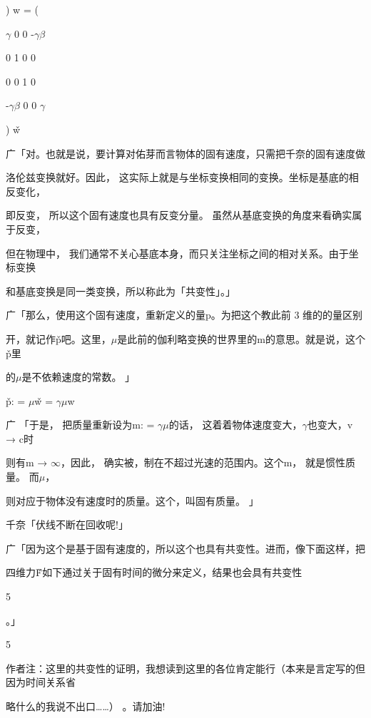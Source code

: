 ) w = (\par
$\gamma$ 0 0 -$\gamma$$\beta$\par
0 1 0 0\par
0 0 1 0\par
-$\gamma$$\beta$ 0 0 $\gamma$\par
) w̌\par
广「对。也就是说，要计算对佑芽而言物体的固有速度，只需把千奈的固有速度做\par
洛伦兹变换就好。因此， 这实际上就是与坐标变换相同的变换。坐标是基底的相反变化，\par
即反变， 所以这个固有速度也具有反变分量。 虽然从基底变换的角度来看确实属于反变，\par
但在物理中， 我们通常不关心基底本身，而只关注坐标之间的相对关系。由于坐标变换\par
和基底变换是同一类变换，所以称此为「共变性」。」\par
广「那么，使用这个固有速度，重新定义的量p。为把这个教此前 3 维的的量区别\par
开，就记作p̌吧。这里，$\mu$是此前的伽利略变换的世界里的m的意思。就是说，这个p̌里\par
的$\mu$是不依赖速度的常数。 」\par
p̌: = $\mu$w̌ = $\gamma$$\mu$w\par
广 「于是， 把质量重新设为m: = $\gamma$$\mu$的话， 这着着物体速度变大，$\gamma$也变大，v → c时\par
则有m → $\infty$，因此， 确实被，制在不超过光速的范围内。这个m， 就是惯性质量。 而$\mu$，\par
则对应于物体没有速度时的质量。这个，叫固有质量。 」\par
千奈「伏线不断在回收呢!」\par
广「因为这个是基于固有速度的，所以这个也具有共变性。进而，像下面这样，把\par
四维力F̌如下通过关于固有时间的微分来定义，结果也会具有共变性\par
5\par
。」\par
5\par
作者注：这里的共变性的证明，我想读到这里的各位肯定能行（本来是言定写的但因为时间关系省\par
略什么的我说不出口……） 。请加油!\par

